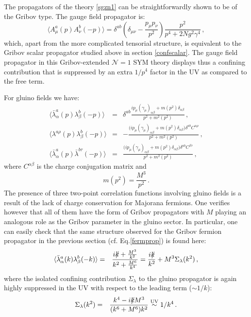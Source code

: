 The propagators of the theory \eqref{sgzn1} can be straightforwardly shown to be of the Gribov type. The gauge field propagator is:
%
\begin{equation}
\langle
A_{\mu}^a(p)A_{\nu}^b(-p)
\rangle
= \delta^{ab}\left(\delta_{\mu\nu}-\frac{p_{\mu}p_{\nu}}{p^2}\right)
\frac{p^2}{p^4+2Ng^2\gamma^4}\,,
\end{equation}
%
which, apart from the more complicated tensorial structure, is equivalent to the Gribov scalar propagator studied above in section \ref{confscalar}. The gauge field propagator in this Gribov-extended $\mathcal N=1$ SYM theory displays thus a confining contribution that is suppressed by an extra $1/p^4$ factor in the UV as compared to the free term.

For gluino fields we have:
%
%
%
\begin{eqnarray}
\langle
\bar{\lambda}_{\alpha}^a(p)
{\lambda}_{\beta}^b(-p)
\rangle
&=&
\delta^{ab}\frac{ip_{\mu}(\gamma_{\mu})_{\alpha\beta}+m(p^2)\delta_{\alpha\beta}}{p^2+m^2(p^2)}
\,,
\\
\langle \lambda^{a\rho}(p)\lambda^{b}_{\beta}(-p)\rangle 
&=& 
- \frac{\big( ip_{\mu}(\gamma_{\mu})_{\alpha\beta} + m(p^2)\delta_{\alpha\beta}\big)\delta^{ab}C^{\alpha\rho}}{p^{2} + m^{2}(p^2)}
\,,
\\
\langle \bar{\lambda}^{a}_{\alpha}(p)\bar{\lambda}^{b\tau}(-p)\rangle 
&=&
\frac{\big( ip_{\mu}(\gamma_{\mu})_{\alpha\beta} + m(p^2)\delta_{\alpha\beta}\big)\delta^{ab}C^{\beta\tau}}{p^{2} + m^{2}(p^2)}
\,,
\end{eqnarray}
%
where $C^{\alpha\beta}$ is the charge conjugation matrix and
%
\begin{equation}
m(p^2)=\frac{M^3}{p^2}\,.
\end{equation}
%
The presence of three two-point correlation functions involving gluino fields is a result of the lack of charge conservation for Majorana fermions. One verifies however that all of them have the form of Gribov propagators with $M$ playing an analogous role as the Gribov parameter in the gluino sector. In particular, one can easily check that the same structure observed for the Gribov fermion propagator
in the previous section (cf. Eq.\eqref{fermprop}) is found here:
\begin{eqnarray} 
\langle
\bar{\lambda}_{\alpha}^a(k)
{\lambda}_{\beta}^b(-k)
\rangle& = & \frac{ik \hspace{-1.7mm} / + \frac{M^3}{k^2}}{k^2 + \frac{M^6}{k^4}} 
= \frac{ik \hspace{-1.7mm} / }{k^2} + M^3 \Sigma_{\lambda}(k^2)\,,
\label{gluinoprop}
\end{eqnarray}
where the isolated confining contribution $\Sigma_{\lambda}$ to the gluino propagator is again highly suppressed in the UV with respect to the leading term ($\sim 1/k$):
\begin{eqnarray} 
\Sigma_{\lambda}(k^2)& = &   \frac{k^4 -ik \hspace{-1.7mm} / M^3  }{(k^6 + M^6)k^2}\stackrel{\rm UV}{\sim} 1/k^4
 \,.
\label{sigmag}
\end{eqnarray}

